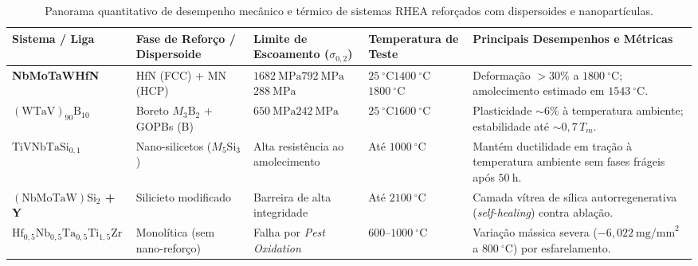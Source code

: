 \begin{table}[!htbp]
\centering
\caption{Panorama quantitativo de desempenho mecânico e térmico de sistemas RHEA reforçados com dispersoides e nanopartículas.}\label{tab:desempenho_nanoparticulas_rhea}
\footnotesize
\begin{tabularx}{\textwidth}{>{\raggedright\arraybackslash}p{2.2cm} >{\raggedright\arraybackslash}p{2.3cm} >{\raggedright\arraybackslash}p{2.0cm} >{\raggedright\arraybackslash}p{1.8cm} >{\raggedright\arraybackslash}X}
\toprule
\textbf{Sistema / Liga} & \textbf{Fase de Reforço / Dispersoide} & \textbf{Limite de Escoamento ($\sigma_{0{,}2}$)} & \textbf{Temperatura de Teste} & \textbf{Principais Desempenhos e Métricas} \\
\midrule
\textbf{NbMoTaWHfN} & $\mathrm{HfN}$ (FCC) + $\mathrm{MN}$ (HCP) & $1682~\mathrm{MPa}$\newline $792~\mathrm{MPa}$\newline $288~\mathrm{MPa}$ & $25~^\circ\mathrm{C}$\newline $1400~^\circ\mathrm{C}$\newline $1800~^\circ\mathrm{C}$ & Deformação $> 30\%$ a $1800~^\circ\mathrm{C}$; amolecimento estimado em $1543~^\circ\mathrm{C}$. \\
\midrule
\textbf{$(\mathrm{WTaV})_{90}\mathrm{B}_{10}$} & Boreto $M_3\mathrm{B}_2$ + GOPBs (B) & $650~\mathrm{MPa}$\newline $242~\mathrm{MPa}$ & $25~^\circ\mathrm{C}$\newline $1600~^\circ\mathrm{C}$ & Plasticidade $\sim 6\%$ à temperatura ambiente; estabilidade até $\sim 0{,}7\,T_m$. \\
\midrule
\textbf{$\mathrm{TiVNbTaSi}_{0{,}1}$} & Nano-silicetos ($M_5\mathrm{Si}_3$) & Alta resistência ao amolecimento & Até $1000~^\circ\mathrm{C}$ & Mantém ductilidade em tração à temperatura ambiente sem fases frágeis após $50~\mathrm{h}$. \\
\midrule
\textbf{$(\mathrm{NbMoTaW})\mathrm{Si}_2$ + Y} & Silicieto modificado & Barreira de alta integridade & Até $2100~^\circ\mathrm{C}$ & Camada vítrea de sílica autorregenerativa (\emph{self-healing}) contra ablação. \\
\midrule
\textbf{$\mathrm{Hf}_{0{,}5}\mathrm{Nb}_{0{,}5}\mathrm{Ta}_{0{,}5}\mathrm{Ti}_{1{,}5}\mathrm{Zr}$} & Monolítica (sem nano-reforço) & Falha por \emph{Pest Oxidation} & $600$--$1000~^\circ\mathrm{C}$ & Variação mássica severa ($-6{,}022~\mathrm{mg/mm}^2$ a $800~^\circ\mathrm{C}$) por esfarelamento. \\
\bottomrule
\end{tabularx}
\end{table}
